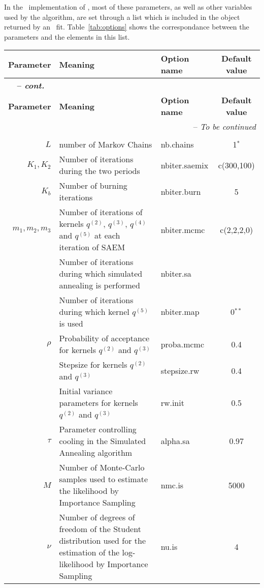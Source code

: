 In the \R~implementation of \saemix, most of these parameters, as well as other variables used by the algorithm, are set through a list which is included in the object returned by an \saemix~fit. Table~\ref{tab:options} shows the correspondance between the parameters and the elements in this list.
\begin{center}
\begin{longtable}{r p{8cm} p{3cm} c}
\hline {\bf Parameter} & {\bf Meaning} & {\bf Option name} & {\bf Default value}\\
\hline
\endfirsthead
\multicolumn{4}{l}{{\itshape \bfseries \tablename\ \thetable{} -- cont.}} \\
\hline {\bf Parameter} & {\bf Meaning} & {\bf Option name} & {\bf Default value}\\
\hline
\endhead
\hline \multicolumn{4}{r}{{-- {\it To be continued}}} \\ 
\endfoot
\endlastfoot
& & \\
\hline
$L$ & number of Markov Chains & {\sf nb.chains} & 1$^*$ \\
$K_1, K_2$ & Number of iterations during the two periods & {\sf nbiter.saemix} & c(300,100)\\
$K_b$ & Number of burning iterations & {\sf nbiter.burn} & 5 \\
$m_1, m_2, m_3$ & Number of iterations of kernels $q^{(2)}$, $q^{(3)}$, $q^{(4)}$ and $q^{(5)}$ at each iteration of SAEM& {\sf nbiter.mcmc} & c(2,2,2,0)\\
 & Number of iterations during which simulated annealing is performed & {\sf nbiter.sa} &  \\
 & Number of iterations during which kernel $q^{(5)}$ is used & {\sf nbiter.map} &  0$^{**}$\\
$\rho$ & Probability of acceptance for kernels $q^{(2)}$ and $q^{(3)}$ & {\sf proba.mcmc} & 0.4 \\
 & Stepsize for kernels $q^{(2)}$ and $q^{(3)}$ & {\sf stepsize.rw} & 0.4 \\
 & Initial variance parameters for kernels $q^{(2)}$ and $q^{(3)}$ & {\sf rw.init} & 0.5\\
$\tau$ & Parameter controlling cooling in the Simulated Annealing algorithm & {\sf alpha.sa} & 0.97 \\
$M$ & Number of Monte-Carlo samples used to estimate the likelihood by Importance Sampling & {\sf nmc.is} & 5000 \\
$\nu$ & Number of degrees of freedom of the Student distribution used for the estimation of the log-likelihood by Importance Sampling & {\sf nu.is} & 4 \\

\end{longtable}
\end{center}

